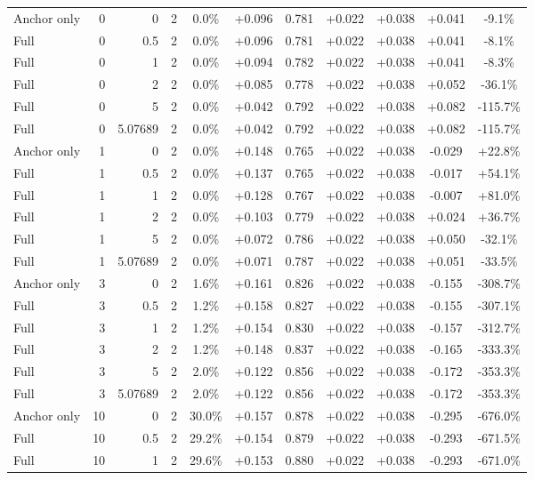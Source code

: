 \begin{table}[htbp]
\begin{tabular}{lrrrccccccc}
Anchor only & 0 & 0 & 2 & 0.0\% & +0.096 & 0.781 & +0.022 & +0.038 & +0.041 & -9.1\% \\
Full & 0 & 0.5 & 2 & 0.0\% & +0.096 & 0.781 & +0.022 & +0.038 & +0.041 & -8.1\% \\
Full & 0 & 1 & 2 & 0.0\% & +0.094 & 0.782 & +0.022 & +0.038 & +0.041 & -8.3\% \\
Full & 0 & 2 & 2 & 0.0\% & +0.085 & 0.778 & +0.022 & +0.038 & +0.052 & -36.1\% \\
Full & 0 & 5 & 2 & 0.0\% & +0.042 & 0.792 & +0.022 & +0.038 & +0.082 & -115.7\% \\
Full & 0 & 5.07689 & 2 & 0.0\% & +0.042 & 0.792 & +0.022 & +0.038 & +0.082 & -115.7\% \\
Anchor only & 1 & 0 & 2 & 0.0\% & +0.148 & 0.765 & +0.022 & +0.038 & -0.029 & +22.8\% \\
Full & 1 & 0.5 & 2 & 0.0\% & +0.137 & 0.765 & +0.022 & +0.038 & -0.017 & +54.1\% \\
Full & 1 & 1 & 2 & 0.0\% & +0.128 & 0.767 & +0.022 & +0.038 & -0.007 & +81.0\% \\
Full & 1 & 2 & 2 & 0.0\% & +0.103 & 0.779 & +0.022 & +0.038 & +0.024 & +36.7\% \\
Full & 1 & 5 & 2 & 0.0\% & +0.072 & 0.786 & +0.022 & +0.038 & +0.050 & -32.1\% \\
Full & 1 & 5.07689 & 2 & 0.0\% & +0.071 & 0.787 & +0.022 & +0.038 & +0.051 & -33.5\% \\
Anchor only & 3 & 0 & 2 & 1.6\% & +0.161 & 0.826 & +0.022 & +0.038 & -0.155 & -308.7\% \\
Full & 3 & 0.5 & 2 & 1.2\% & +0.158 & 0.827 & +0.022 & +0.038 & -0.155 & -307.1\% \\
Full & 3 & 1 & 2 & 1.2\% & +0.154 & 0.830 & +0.022 & +0.038 & -0.157 & -312.7\% \\
Full & 3 & 2 & 2 & 1.2\% & +0.148 & 0.837 & +0.022 & +0.038 & -0.165 & -333.3\% \\
Full & 3 & 5 & 2 & 2.0\% & +0.122 & 0.856 & +0.022 & +0.038 & -0.172 & -353.3\% \\
Full & 3 & 5.07689 & 2 & 2.0\% & +0.122 & 0.856 & +0.022 & +0.038 & -0.172 & -353.3\% \\
Anchor only & 10 & 0 & 2 & 30.0\% & +0.157 & 0.878 & +0.022 & +0.038 & -0.295 & -676.0\% \\
Full & 10 & 0.5 & 2 & 29.2\% & +0.154 & 0.879 & +0.022 & +0.038 & -0.293 & -671.5\% \\
Full & 10 & 1 & 2 & 29.6\% & +0.153 & 0.880 & +0.022 & +0.038 & -0.293 & -671.0\% \\

\end{tabular}
\end{table}
